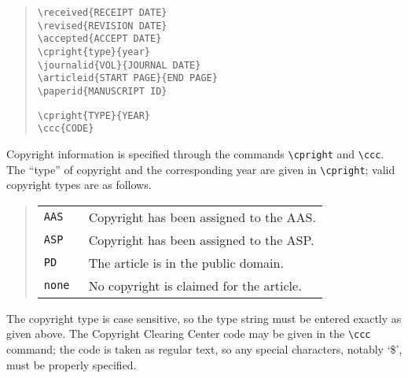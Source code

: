 \begin{quote}
\verb"\received{RECEIPT DATE}"\\
\verb"\revised{REVISION DATE}"\\
\verb"\accepted{ACCEPT DATE}"\\
\verb"\cpright{type}{year}"\\


\verb"\journalid{VOL}{JOURNAL DATE}"\\
\verb"\articleid{START PAGE}{END PAGE}"\\
\verb"\paperid{MANUSCRIPT ID}"


\verb"\cpright{TYPE}{YEAR}"\\
\verb"\ccc{CODE}"
\end{quote}

Copyright information is specified through the commands \verb"\cpright"
and \verb"\ccc".  The ``type'' of copyright and the corresponding year
are given in \verb"\cpright"; valid copyright types are as follows.
\begin{quote}
\begin{tabular}{l@{\quad}p{2in}}
\tt AAS & Copyright has been assigned to the AAS.\\
\tt ASP & Copyright has been assigned to the ASP.\\
\tt PD & The article is in the public domain.\\
\tt none & No copyright is claimed for the article.\\
\end{tabular}
\end{quote}
The copyright type is case sensitive, so the type string must be
entered exactly as given above.
The Copyright Clearing Center code may be given in the \verb"\ccc"
command; the code is taken as regular text, so any special characters,
notably `\$', must be properly specified.

